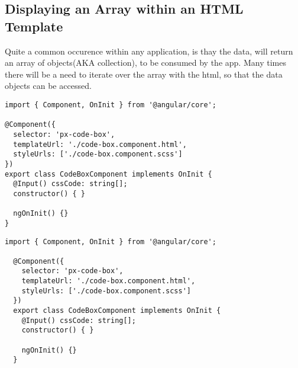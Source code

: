\subsection{ Displaying an Array within an HTML Template }
Quite a common occurence within any application, is thay the data, will return
an array of objects(AKA collection), to be consumed by the app. Many times
there will be a need to iterate over the array with the html, so that the data
objects can be accessed. 
\begin{lstlisting}[caption=px-code-box.component.ts]
import { Component, OnInit } from '@angular/core';

@Component({
  selector: 'px-code-box',
  templateUrl: './code-box.component.html',
  styleUrls: ['./code-box.component.scss']
})
export class CodeBoxComponent implements OnInit {
  @Input() cssCode: string[];
  constructor() { }

  ngOnInit() {}
} 
\end{lstlisting}

\begin{lstlisting}[caption=px-code-box.component.ts]
  import { Component, OnInit } from '@angular/core';
  
  @Component({
    selector: 'px-code-box',
    templateUrl: './code-box.component.html',
    styleUrls: ['./code-box.component.scss']
  })
  export class CodeBoxComponent implements OnInit {
    @Input() cssCode: string[];
    constructor() { }
  
    ngOnInit() {}
  } 
  \end{lstlisting}